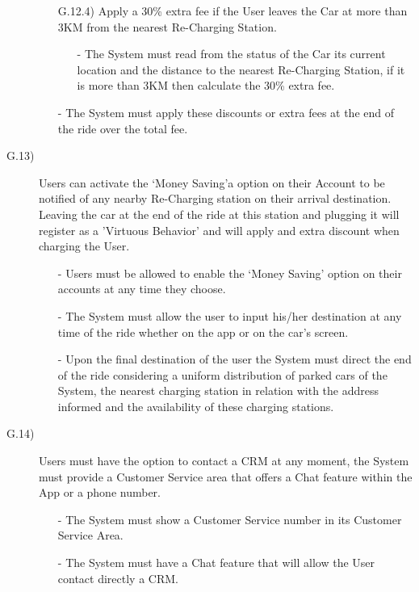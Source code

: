 \documentclass[a4paper]{article}
\begin{document}
\begin{description}
\begin{itemize}
	\item [G.12.4)]Apply a 30\% extra fee if the User leaves the Car at more than 3KM from the nearest Re-Charging Station.
	\begin{itemize}
	\item[-]The System must read from the status of the Car its current location and the distance to the nearest Re-Charging Station, if it is more than 3KM then calculate the 30\% extra fee.
	\end{itemize}
	\item[-]The System must apply these discounts or extra fees at the end of the ride over the total fee.
\end{itemize}

\item [G.13)]Users can activate the `Money Saving'a option on their Account to be notified of any nearby Re-Charging station on their arrival destination. Leaving the car at the end of the ride at this station and plugging it will register as a 'Virtuous Behavior' and will apply and extra discount when charging the User.
\begin{itemize}
	\item[-]Users must be allowed to enable the ‘Money Saving’ option on their accounts at any time they choose.
	\item[-]The System must allow the user to input his/her destination at any time of the ride whether on the app or on the car’s screen.
	\item[-]Upon the final destination of the user the System must direct the end of the ride considering a uniform distribution of parked cars of the System, the nearest charging station in relation with the address informed and  the availability of these charging stations.
\end{itemize}
\item [G.14)]Users must have the option to contact a CRM at any moment, the System must provide a Customer Service area that offers a Chat feature within the App or a phone number.
\begin{itemize}
	\item[-]The System must show a Customer Service number in its Customer Service Area.
	\item[-]The System must have a Chat feature that will allow the User contact directly a CRM.
\end{itemize}
\end{description}
\end{document}
